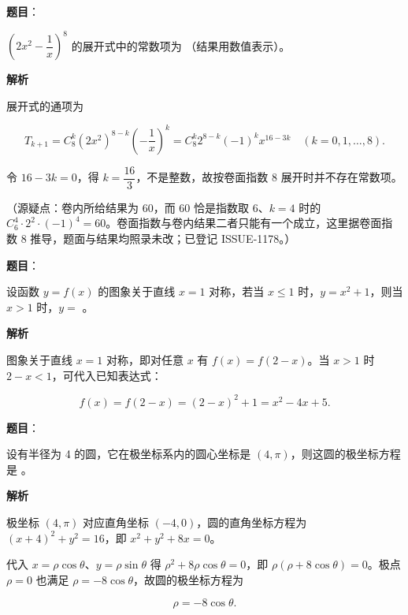 \begin{answer}

\textbf{题目}：

$\left(2x^{2}-\dfrac{1}{x}\right)^{8}$ 的展开式中的常数项为 \gkblank{}（结果用数值表示）。

\textbf{解析}

展开式的通项为

\nopagebreak[4]
\[
T_{k+1}=C_{8}^{k}\left(2x^{2}\right)^{8-k}\left(-\frac{1}{x}\right)^{k}=C_{8}^{k}2^{8-k}(-1)^{k}x^{16-3k}\quad (k=0,1,\dots,8).
\]

令 $16-3k=0$，得 $k=\dfrac{16}{3}$，不是整数，故按卷面指数 8 展开时并不存在常数项。

（源疑点：卷内所给结果为 60，而 60 恰是指数取 6、$k=4$ 时的 $C_{6}^{4}\cdot 2^{2}\cdot(-1)^{4}=60$。卷面指数与卷内结果二者只能有一个成立，这里据卷面指数 8 推导，题面与结果均照录未改；已登记 ISSUE-1178。）


\end{answer}
\begin{answer}

\textbf{题目}：

设函数 $y=f(x)$ 的图象关于直线 $x=1$ 对称，若当 $x\le 1$ 时，$y=x^{2}+1$，则当 $x>1$ 时，$y=$ \gkblank{}。

\textbf{解析}

图象关于直线 $x=1$ 对称，即对任意 $x$ 有 $f(x)=f(2-x)$。当 $x>1$ 时 $2-x<1$，可代入已知表达式：

\nopagebreak[4]
\[
f(x)=f(2-x)=(2-x)^{2}+1=x^{2}-4x+5.
\]


\end{answer}
\begin{answer}

\textbf{题目}：

设有半径为 4 的圆，它在极坐标系内的圆心坐标是 $(4,\pi)$，则这圆的极坐标方程是 \gkblank{}。

\textbf{解析}

极坐标 $(4,\pi)$ 对应直角坐标 $(-4,0)$，圆的直角坐标方程为 $(x+4)^{2}+y^{2}=16$，即 $x^{2}+y^{2}+8x=0$。

代入 $x=\rho\cos\theta$、$y=\rho\sin\theta$ 得 $\rho^{2}+8\rho\cos\theta=0$，即 $\rho(\rho+8\cos\theta)=0$。极点 $\rho=0$ 也满足 $\rho=-8\cos\theta$，故圆的极坐标方程为

\nopagebreak[4]
\[
\rho=-8\cos\theta.
\]


\end{answer}

